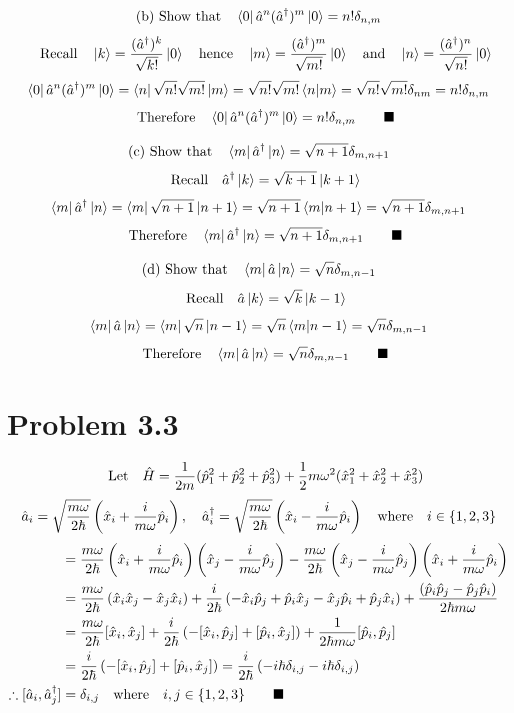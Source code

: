 \documentclass{amsart}
\begin{document}
\[\qq*{(b) Show that}\bra{0}\hat{a}^n(\hat{a}^\dagger)^m\ket{0} =n!\delta_{n,m}  \]
\[\qq{Recall} \ket{k}=\frac{(\hat{a}^\dagger)^k}{\sqrt{k!}}\ket{0}\qq{hence} \ket{m}=\frac{(\hat{a}^\dagger)^m}{\sqrt{m!}}\ket{0} \qq{and}\ket{n}=\frac{(\hat{a}^\dagger)^n}{\sqrt{n!}}\ket{0}\]
\[\bra{0}\hat{a}^n(\hat{a}^\dagger)^m\ket{0} =\bra{n}\sqrt{n!}\sqrt{m!}\ket{m}=\sqrt{n!}\sqrt{m!}\bra{n}\ket{m}=\sqrt{n!}\sqrt{m!}\delta_{nm}=n!\delta_{n,m}\]
\[\qq{Therefore}\bra{0}\hat{a}^n(\hat{a}^\dagger)^m\ket{0} =n!\delta_{n,m}\qquad\blacksquare\]

\[\qq*{(c) Show that}\bra{m}\hat{a}^\dagger\ket{n}  =\sqrt{n+1}\delta_{m,n+1}  \]
\[\qq{Recall}\hat{a}^\dagger\ket{k}=\sqrt{k+1}\ket{k+1}\]
\[\bra{m}\hat{a}^\dagger\ket{n} = \bra{m}\sqrt{n+1}\ket{n+1}  = \sqrt{n+1}\bra{m}\ket{n+1}=\sqrt{n+1}\delta_{m,n+1}\]
\[\qq{Therefore}\bra{m}\hat{a}^\dagger\ket{n}  =\sqrt{n+1}\delta_{m,n+1}\qquad\blacksquare\]

\[\qq*{(d) Show that}\bra{m}\hat{a}\ket{n} =\sqrt{n}\delta_{m,n-1} \]
\[\qq{Recall}\hat{a}\ket{k}=\sqrt{k}\ket{k-1}\]
\[\bra{m}\hat{a}\ket{n} = \bra{m}\sqrt{n}\ket{n-1}  = \sqrt{n}\bra{m}\ket{n-1}=\sqrt{n}\delta_{m,n-1}\]
\[\qq{Therefore}\bra{m}\hat{a}\ket{n}  =\sqrt{n}\delta_{m,n-1}\qquad\blacksquare\]

\section*{Problem 3.3}
\[\qq{Let}\hat{H}=\frac{1}{2m}(\hat{p}^2_1+\hat{p}^2_2+\hat{p}^2_3) + \frac{1}{2}m\omega^2(\hat{x}^2_1+\hat{x}^2_2+\hat{x}^2_3) \]
\[\hat{a}_i=\sqrt{\frac{m\omega}{2\hbar}}\left(\hat{x}_i+\frac{i}{m\omega}\hat{p}_i\right)\qcomma\hat{a}^\dagger_i=\sqrt{\frac{m\omega}{2\hbar}}\left(\hat{x}_i-\frac{i}{m\omega}\hat{p}_i\right)\qq{where}i\in\{1,2,3\}\]
\begin{align*}
    [\hat{a}_i,\hat{a}^\dagger_j]&=\frac{m\omega}{2\hbar}\left(\hat{x}_i+\frac{i}{m\omega}\hat{p}_i\right)\left(\hat{x}_j-\frac{i}{m\omega}\hat{p}_j\right)-\frac{m\omega}{2\hbar}\left(\hat{x}_j-\frac{i}{m\omega}\hat{p}_j\right)\left(\hat{x}_i+\frac{i}{m\omega}\hat{p}_i\right)\\
    &=\frac{m\omega}{2\hbar}\left(\hat{x}_i\hat{x}_j-\hat{x}_j\hat{x}_i\right)+\frac{i}{2\hbar}\left(-\hat{x}_i\hat{p}_j+\hat{p}_i\hat{x}_j-\hat{x}_j\hat{p}_i+\hat{p}_j\hat{x}_i\right)+\frac{\left(\hat{p}_i\hat{p}_j-\hat{p}_j\hat{p}_i\right)}{2\hbar m\omega}\\
    &=\frac{m\omega}{2\hbar}[\hat{x}_i,\hat{x}_j]+\frac{i}{2\hbar}\left(-[\hat{x}_i,\hat{p}_j]+[\hat{p}_i,\hat{x}_j]\right)+\frac{1}{2\hbar m\omega}[\hat{p}_i,\hat{p}_j]\\
    &=\frac{i}{2\hbar}\left(-[\hat{x}_i,\hat{p}_j]+[\hat{p}_i,\hat{x}_j]\right)=\frac{i}{2\hbar}\left(-i\hbar\delta_{i,j}-i\hbar\delta_{i,j}\right)\\
    \therefore[\hat{a}_i,\hat{a}^\dagger_j]&=\delta_{i,j}\qq{where}i,j\in\{1,2,3\}\qquad\blacksquare
\end{align*}
\end{document}
